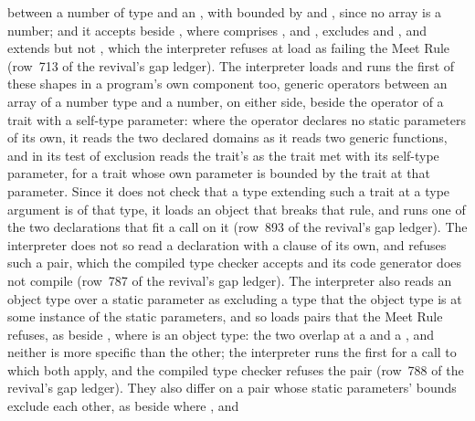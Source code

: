 \begin{description}
between a number of type  and an
, with  bounded by
 and , since no
array is a number; and it accepts
beside , where  comprises ,  and
,  excludes  and , and  extends 
but not , which the interpreter refuses at load as failing the Meet Rule
(row~713 of the revival's gap ledger).
The interpreter loads and runs the first of these shapes in a program's own
component too, generic operators between an array of a number type and a
number, on either side, beside the operator of a trait with a self-type
parameter: where the operator declares no static parameters of its own, it
reads the two declared domains as it reads two generic functions, and in its
test of exclusion reads the trait's  as the trait met with its
self-type parameter, for a trait whose own parameter is bounded by the trait
at that parameter.
Since it does not check that a type extending such a trait at a type argument
is of that type, it loads an object that breaks that rule, and runs one of the
two declarations that fit a call on it (row~893 of the revival's gap ledger).
The interpreter does not so read a declaration with a  clause of its
own, and refuses such a pair, which the compiled type checker accepts and its
code generator does not compile (row~787 of the revival's gap ledger).
The interpreter also reads an object type over a static parameter as excluding
a type that the object type is at some instance of the static parameters, and
so loads pairs that the Meet Rule refuses, as
 beside , where 
is an object type: the two overlap at a
 and a , and
neither is more specific than the other; the interpreter runs the first for a
call to which both apply, and the compiled type checker refuses the pair
(row~788 of the revival's gap ledger).
They also differ on a pair whose static parameters' bounds exclude each other, as
 beside
 where ,  and

\end{description}
